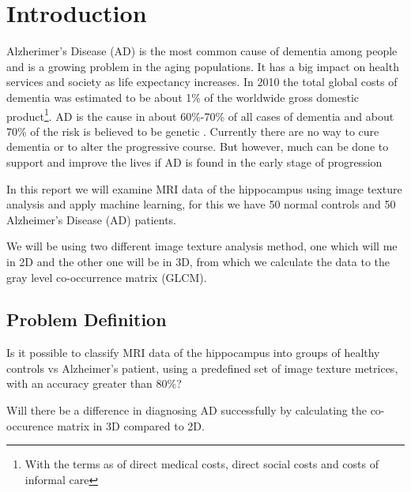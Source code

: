\chapter{Introduction}

Alzherimer's Disease (AD) is the most common cause of dementia among people and is a growing problem in the aging populations. It has a big impact on health services and society as life expectancy increases. In 2010 the total global costs of dementia was estimated to be about 1\% of the worldwide gross domestic product\footnote{With the terms as of direct medical costs, direct social costs and costs of informal care}. AD is the cause in about 60\%-70\% of all cases of dementia\cite{Who} and about 70\% of the risk is believed to be genetic \cite{AlzheimerLancet}. Currently there are no way to cure dementia or to alter the progressive course. But however, much can be done to support and improve the lives if AD is found in the early stage of progression \cite{Who}

In this report we will examine MRI data of the hippocampus using image texture analysis and apply machine learning, for this we have 50 normal controls and 50 Alzheimer's Disease (AD) patients.

We will be using two different image texture analysis method, one which will me in 2D\cite{MRfreeborough}\cite{Castellano} and the other one will be in 3D\cite{Voxel}, from which we calculate the data to the gray level co-occ\-urren\-ce matrix (GLCM).



\section{Problem Definition}

Is it possible to classify MRI data of the hippocampus into groups of healthy controls vs Alzheimer's patient, using a predefined set of image texture metrices, with an accuracy great\-er than 80\%?

Will there be a difference in diagnosing AD successfully by calculating the co-occurence matrix in 3D compared to 2D.








